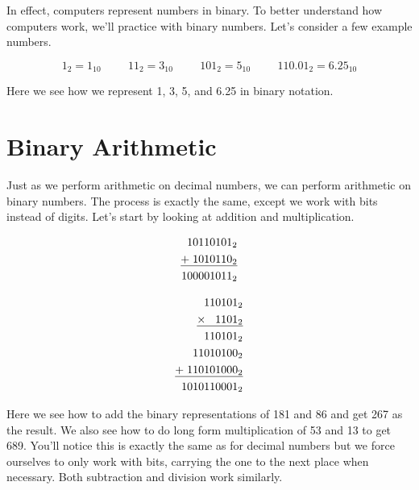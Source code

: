 In effect, computers represent numbers in binary. To better understand how
computers work, we’ll practice with binary numbers. Let’s consider a few
example numbers.

$$1_2 = 1_{10} \hspace{1cm} 11_2 = 3_{10} \hspace{1cm} 101_2 = 5_{10} \hspace{1cm} 110.01_2 = 6.25_{10}$$

Here we see how we represent 1, 3, 5, and 6.25 in binary notation.

\section{Binary Arithmetic}
Just as we perform arithmetic on decimal numbers, we can perform arithmetic on
binary numbers. The process is exactly the same, except we work with bits instead of
digits. Let’s start by looking at addition and multiplication.

\noindent%
\begin{minipage}{.5\linewidth}
\begin{align*}
10110101_2&\\
\underline{+\hspace{1mm}1010110_2}&\\
100001011_2&\\
\end{align*}
\end{minipage}%
\begin{minipage}{.5\linewidth}
\begin{align*}
110101_2&\\
\underline{\times\hspace{3mm}1101_2}&\\
110101_2&\\
11010100_2&\\
\underline{+\hspace{1mm}110101000_2}&\\
1010110001_2&\\
\end{align*}
\end{minipage}

Here we see how to add the binary representations of 181 and 86 and get 267 as the
result. We also see how to do long form multiplication of 53 and 13 to get 689. You’ll
notice this is exactly the same as for decimal numbers but we force ourselves to only
work with bits, carrying the one to the next place when necessary. Both subtraction
and division work similarly.

